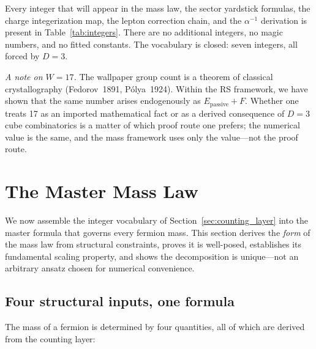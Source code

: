 \documentclass[11pt,a4paper]{article}
\theoremstyle{definition}
\theoremstyle{remark}
\newcommand{\Epass}{E_{\mathrm{passive}}}
\begin{document}
\noindent
Every integer that will appear in the mass law, the sector yardstick
formulas, the charge integerization map, the lepton correction chain, and the
$\alpha^{-1}$ derivation is present in Table~\ref{tab:integers}.  There are
no additional integers, no magic numbers, and no fitted constants.  The
vocabulary is closed: seven integers, all forced by $D = 3$.

\medskip
\noindent\textit{A note on $W = 17$.}\quad
The wallpaper group count is a theorem of classical crystallography
(Fedorov~1891, P\'olya~1924).  Within the RS framework, we have shown that
the same number arises endogenously as $\Epass + F$.  Whether one treats 17
as an imported mathematical fact or as a derived consequence of
$D = 3$ cube combinatorics is a matter of which proof route one prefers;
the numerical value is the same, and the mass framework uses only the
value---not the proof route.



\section{The Master Mass Law}
\label{sec:mass_law}

We now assemble the integer vocabulary of Section~\ref{sec:counting_layer}
into the master formula that governs every fermion mass.  This section derives
the \emph{form} of the mass law from structural constraints, proves it is
well-posed, establishes its fundamental scaling property, and shows the
decomposition is unique---not an arbitrary ansatz chosen for numerical
convenience.

\subsection{Four structural inputs, one formula}

The mass of a fermion is determined by four quantities, all of which are
derived from the counting layer:
\end{document}
